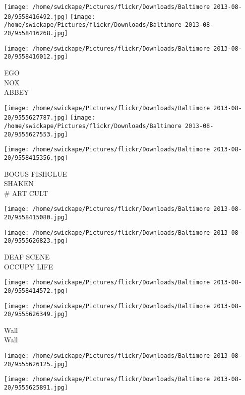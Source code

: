 \documentclass[10pt,letterpaper]{article}
\begin{document}
\texttt{[image: /home/swickape/Pictures/flickr/Downloads/Baltimore 2013-08-20/9558416492.jpg]}
\texttt{[image: /home/swickape/Pictures/flickr/Downloads/Baltimore 2013-08-20/9558416268.jpg]}

\vspace{0.25in}
\texttt{[image: /home/swickape/Pictures/flickr/Downloads/Baltimore 2013-08-20/9558416012.jpg]}

EGO\\
NOX\\
ABBEY\\
\pagebreak

\texttt{[image: /home/swickape/Pictures/flickr/Downloads/Baltimore 2013-08-20/9555627787.jpg]}
\texttt{[image: /home/swickape/Pictures/flickr/Downloads/Baltimore 2013-08-20/9555627553.jpg]}

\vspace{0.25in}
\texttt{[image: /home/swickape/Pictures/flickr/Downloads/Baltimore 2013-08-20/9558415356.jpg]}

BOGUS FISHGLUE\\
SHAKEN\\
\# ART CULT\\
\pagebreak

\texttt{[image: /home/swickape/Pictures/flickr/Downloads/Baltimore 2013-08-20/9558415080.jpg]}

\vspace{0.25in}
\texttt{[image: /home/swickape/Pictures/flickr/Downloads/Baltimore 2013-08-20/9555626823.jpg]}

DEAF SCENE\\
OCCUPY LIFE\\
\pagebreak

\texttt{[image: /home/swickape/Pictures/flickr/Downloads/Baltimore 2013-08-20/9558414572.jpg]}

\vspace{0.25in}
\texttt{[image: /home/swickape/Pictures/flickr/Downloads/Baltimore 2013-08-20/9555626349.jpg]}

Wall\\
Wall\\
\pagebreak

\texttt{[image: /home/swickape/Pictures/flickr/Downloads/Baltimore 2013-08-20/9555626125.jpg]}

\vspace{0.25in}
\texttt{[image: /home/swickape/Pictures/flickr/Downloads/Baltimore 2013-08-20/9555625891.jpg]}
\end{document}
